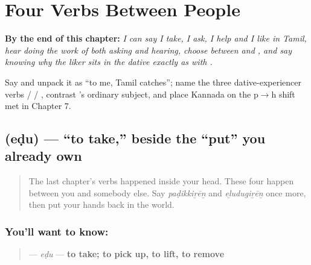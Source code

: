 
\chapter{Four Verbs Between People}
\label{ch:ta-verbs-between-people}

\begin{chapteropening}
\textbf{By the end of this chapter:} \emph{I can say I take, I ask, I help and I like in Tamil, hear  doing the work of both asking and hearing, choose between  and , and say   knowing why the liker sits in the dative exactly as with .}

Say    and unpack it as \textquotedblleft{}to me, Tamil catches\textquotedblright{}; name the three dative-experiencer verbs  /  / , contrast ’s ordinary subject, and place Kannada  on the p$\to$h shift met in Chapter 7.
\end{chapteropening}

\section[\texorpdfstring{\ta{எடு} (eḍu)}{எடு (eḍu)}]{ (eḍu) — \textquotedblleft{}to take,\textquotedblright{} beside the \textquotedblleft{}put\textquotedblright{} you already own}

\label{lesson:TA-C34-edu}



\begin{quote}
The last chapter's verbs happened inside your head. These four happen between you and somebody else. Say \emph{paḍikkiṟēṉ} and \emph{eḻudugiṟēṉ} once more, then put your hands back in the world.
\end{quote}

\subsection*{You'll want to know: }
\begin{quote}
\textbf{} — \emph{eḍu} — \textbf{to take; to pick up, to lift, to remove}
\end{quote}

